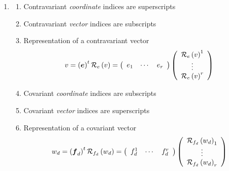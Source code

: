 \documentclass[aps,preprint]{revtex4}%
\begin{document}
\begin{enumerate}
\item
\begin{enumerate}
\item Contravariant \emph{coordinate} indices are superscripts

\item Contravariant \emph{vector} indices are subscripts

\item Representation of a contravariant vector
\begin{equation}
v=\left(  \boldsymbol{e}\right)  ^{t}\mathcal{R}_{e}\left(  v\right)  =\left(
%
\begin{array}
[c]{ccc}%
e_{1} & \cdots & e_{r}%
\end{array}
\right)  \left(
\begin{array}
[c]{c}%
\mathcal{R}_{e}\left(  v\right)  ^{1}\\
\vdots\\
\mathcal{R}_{e}\left(  v\right)  ^{r}%
\end{array}
\right)
\end{equation}


\item Covariant \emph{coordinate} indices are subscripts

\item Covariant \emph{vector} indices are superscripts

\item Representation of a covariant vector%
\begin{equation}
w_{d}=\left(  \boldsymbol{f}_{d}\right)  ^{t}\mathcal{R}_{f_{d}}\left(
w_{d}\right)  =\left(
\begin{array}
[c]{ccc}%
f_{d}^{1} & \cdots & f_{d}^{r}%
\end{array}
\right)  \left(
\begin{array}
[c]{c}%
\mathcal{R}_{f_{d}}\left(  w_{d}\right)  _{1}\\
\vdots\\
\mathcal{R}_{f_{d}}\left(  w_{d}\right)  _{r}%
\end{array}
\right)
\end{equation}

\end{enumerate}
\end{enumerate}
\end{document}

